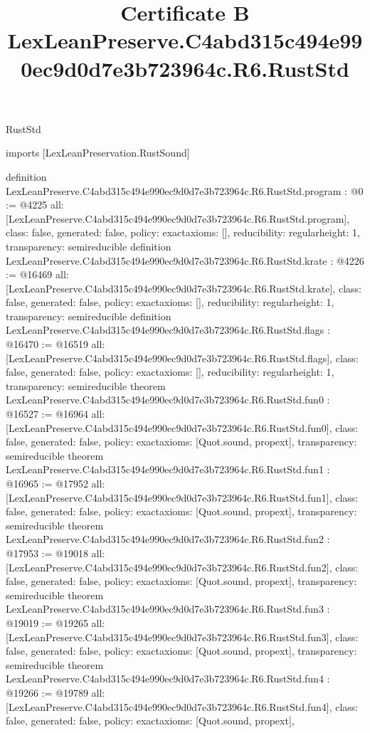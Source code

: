 \begin{lexlean}{RustStd}
\title{Certificate B LexLeanPreserve.C4abd315c494e990ec9d0d7e3b723964c.R6.RustStd}
\begin{coremodule}
imports [LexLeanPreservation.RustSound]

definition LexLeanPreserve.C4abd315c494e990ec9d0d7e3b723964c.R6.RustStd.program : @0 := @4225 {
  all: [LexLeanPreserve.C4abd315c494e990ec9d0d7e3b723964c.R6.RustStd.program],
  class: false,
  generated: false,
  policy: exact{axioms: []},
  reducibility: regular{height: 1},
  transparency: semireducible
}
definition LexLeanPreserve.C4abd315c494e990ec9d0d7e3b723964c.R6.RustStd.krate : @4226 := @16469 {
  all: [LexLeanPreserve.C4abd315c494e990ec9d0d7e3b723964c.R6.RustStd.krate],
  class: false,
  generated: false,
  policy: exact{axioms: []},
  reducibility: regular{height: 1},
  transparency: semireducible
}
definition LexLeanPreserve.C4abd315c494e990ec9d0d7e3b723964c.R6.RustStd.flags : @16470 := @16519 {
  all: [LexLeanPreserve.C4abd315c494e990ec9d0d7e3b723964c.R6.RustStd.flags],
  class: false,
  generated: false,
  policy: exact{axioms: []},
  reducibility: regular{height: 1},
  transparency: semireducible
}
theorem LexLeanPreserve.C4abd315c494e990ec9d0d7e3b723964c.R6.RustStd.fun0 : @16527 := @16964 {
  all: [LexLeanPreserve.C4abd315c494e990ec9d0d7e3b723964c.R6.RustStd.fun0],
  class: false,
  generated: false,
  policy: exact{axioms: [Quot.sound, propext]},
  transparency: semireducible
}
theorem LexLeanPreserve.C4abd315c494e990ec9d0d7e3b723964c.R6.RustStd.fun1 : @16965 := @17952 {
  all: [LexLeanPreserve.C4abd315c494e990ec9d0d7e3b723964c.R6.RustStd.fun1],
  class: false,
  generated: false,
  policy: exact{axioms: [Quot.sound, propext]},
  transparency: semireducible
}
theorem LexLeanPreserve.C4abd315c494e990ec9d0d7e3b723964c.R6.RustStd.fun2 : @17953 := @19018 {
  all: [LexLeanPreserve.C4abd315c494e990ec9d0d7e3b723964c.R6.RustStd.fun2],
  class: false,
  generated: false,
  policy: exact{axioms: [Quot.sound, propext]},
  transparency: semireducible
}
theorem LexLeanPreserve.C4abd315c494e990ec9d0d7e3b723964c.R6.RustStd.fun3 : @19019 := @19265 {
  all: [LexLeanPreserve.C4abd315c494e990ec9d0d7e3b723964c.R6.RustStd.fun3],
  class: false,
  generated: false,
  policy: exact{axioms: [Quot.sound, propext]},
  transparency: semireducible
}
theorem LexLeanPreserve.C4abd315c494e990ec9d0d7e3b723964c.R6.RustStd.fun4 : @19266 := @19789 {
  all: [LexLeanPreserve.C4abd315c494e990ec9d0d7e3b723964c.R6.RustStd.fun4],
  class: false,
  generated: false,
  policy: exact{axioms: [Quot.sound, propext]},
}
\end{coremodule}
\end{lexlean}
